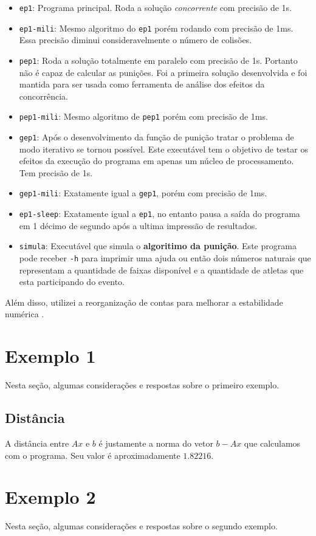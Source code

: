 \documentclass[12pt,a4paper]{article}
\begin{document}
\begin{itemize}
\item \verb+ep1+: Programa principal. Roda a solução \textit{concorrente} com precisão de 1s.
\item \verb+ep1-mili+: Mesmo algoritmo do \verb+ep1+ porém rodando com precisão de 1ms. Essa precisão diminui consideravelmente o número de colisões.
\item \verb+pep1+: Roda a solução totalmente em paralelo com precisão de 1s. Portanto não é capaz de calcular as punições. Foi a primeira solução desenvolvida e foi mantida para ser usada como ferramenta de análise dos efeitos da concorrência.
\item \verb+pep1-mili+: Mesmo algoritmo de \verb+pep1+ porém com precisão de 1ms.
\item \verb+gep1+: Após o desenvolvimento da função de punição tratar o problema de modo iterativo se tornou possível. Este executável tem o objetivo de testar os efeitos da execução do programa em apenas um núcleo de processamento. Tem precisão de 1s.
\item \verb+gep1-mili+: Exatamente igual a \verb+gep1+, porém com precisão de 1ms.
\item \verb+ep1-sleep+: Exatamente igual a \verb+ep1+, no entanto pausa a saída do programa em 1 décimo de segundo após a ultima impressão de resultados.
\item \verb+simula+: Executável que simula o \textbf{algoritimo da punição}. Este programa pode receber \verb+-h+ para imprimir uma ajuda ou então dois números naturais que representam a quantidade de faixas disponível e a quantidade de atletas que esta participando do evento.
\end{itemize}

Além disso, utilizei a reorganização de contas para melhorar a estabilidade numérica \cite{GSM}.

\section{Exemplo 1}
Nesta seção, algumas considerações e respostas sobre o primeiro exemplo.
\subsection{Distância}
A distância entre $Ax$ e $b$ é justamente a norma do vetor $b-Ax$ que calculamos com o programa.
Seu valor é aproximadamente $1.82216$.

\pagebreak
\section{Exemplo 2}
Nesta seção, algumas considerações e respostas sobre o segundo exemplo.
\end{document}
